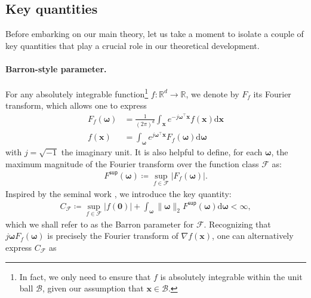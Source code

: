 \documentclass[english]{article}
\newcommand{\yxc}[1]{\textcolor{yxccolor}{[YXC: #1]}}
\newcommand{\ytw}[1]{\textcolor{ytwcolor}{[YTW: #1]}}
\begin{document}
\subsection{Key quantities}
\label{sec:Barron-pars}

Before embarking on our main theory,  let us take a moment to isolate a couple of key quantities that play a crucial role in our theoretical development. 




\paragraph{Barron-style parameter.} 
For any absolutely integrable function\footnote{In fact, we only need to ensure that $f$ is absolutely integrable within the unit ball $\mathcal{B}$, given our assumption that $\bm{x}\in \mathcal{B}$. } $f: \mathbb{R}^{d} \rightarrow \mathbb{R}$, 
we denote by $F_f$ its Fourier transform, 
which allows one to express
%
\begin{subequations}
\begin{align}
F_f(\bm{\omega} )  &= \frac{1}{(2\pi)^d}\int_{\bm{x}} e^{-j \bm{\omega}^{\top}{\bm x}}f({\bm x}) \mathrm{d} \bm{x} \\
f({\bm x}) &= \int_{\bm{\omega}} e^{j \bm{\omega}^{\top}{\bm x}}F_f(\bm{\omega} ) \mathrm{d} \bm{\omega}
\end{align}
\end{subequations}
%
with $j=\sqrt{-1}$ the imaginary unit. 
It is also helpful to define, for each $\bm{\omega}$, the maximum magnitude of the Fourier transform over the function class $\mathcal{F}$ as:
%
\begin{align}
F^{\mathsf{sup}}(\bm{\omega}) \coloneqq \sup_{f \in \mathcal{F}} \big| F_f(\bm{\omega}) \big|. 
\end{align}
%
Inspired by the seminal work \citet{Barron1993Universal}, we introduce the key quantity:
%
\begin{align}
\label{eq:condition-Fourier}
C_{\mathcal{F}} \coloneqq \sup_{f\in \mathcal{F}}|f(\bm{0})| + \int_{\bm{\omega}} \|\bm{\omega}\|_2F^{\mathsf{sup}}(\bm{\omega})\mathrm{d}\bm{\omega} < \infty,
\end{align}
%
which we shall refer to as the Barron parameter for $\mathcal{F}$. 
Recognizing that $j\bm{\omega} F_f(\bm{\omega})$ is precisely the Fourier transform of $\nabla f(\bm{x})$, one can alternatively express $C_{\mathcal{F}}$ as
\end{document}
